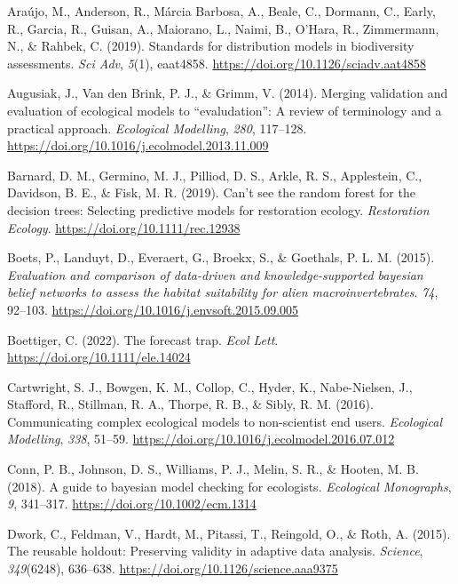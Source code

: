 \documentclass[
]{article}
\newlength{\cslhangindent}
\newenvironment{CSLReferences}[2] %
 {\begin{list}{}{%
  \setlength{\itemindent}{0pt}
  \setlength{\leftmargin}{0pt}
  \setlength{\parsep}{0pt}
  \ifodd #1
   \setlength{\leftmargin}{\cslhangindent}
   \setlength{\itemindent}{-1\cslhangindent}
  \fi
  \setlength{\itemsep}{#2\baselineskip}}}
 {\end{list}}
\begin{document}
\label{refs}
\begin{CSLReferences}{1}{0}
Araújo, M., Anderson, R., Márcia Barbosa, A., Beale, C., Dormann, C.,
Early, R., Garcia, R., Guisan, A., Maiorano, L., Naimi, B., O'Hara, R.,
Zimmermann, N., \& Rahbek, C. (2019). Standards for distribution models
in biodiversity assessments. \emph{Sci Adv}, \emph{5}(1), eaat4858.
\url{https://doi.org/10.1126/sciadv.aat4858}

Augusiak, J., Van den Brink, P. J., \& Grimm, V. (2014). Merging
validation and evaluation of ecological models to {``evaludation''}: A
review of terminology and a practical approach. \emph{Ecological
Modelling}, \emph{280}, 117--128.
\url{https://doi.org/10.1016/j.ecolmodel.2013.11.009}

Barnard, D. M., Germino, M. J., Pilliod, D. S., Arkle, R. S.,
Applestein, C., Davidson, B. E., \& Fisk, M. R. (2019). Can't see the
random forest for the decision trees: Selecting predictive models for
restoration ecology. \emph{Restoration Ecology}.
\url{https://doi.org/10.1111/rec.12938}

Boets, P., Landuyt, D., Everaert, G., Broekx, S., \& Goethals, P. L. M.
(2015). \emph{Evaluation and comparison of data-driven and
knowledge-supported bayesian belief networks to assess the habitat
suitability for alien macroinvertebrates}. \emph{74}, 92--103.
\url{https://doi.org/10.1016/j.envsoft.2015.09.005}

Boettiger, C. (2022). The forecast trap. \emph{Ecol Lett}.
\url{https://doi.org/10.1111/ele.14024}

Cartwright, S. J., Bowgen, K. M., Collop, C., Hyder, K., Nabe-Nielsen,
J., Stafford, R., Stillman, R. A., Thorpe, R. B., \& Sibly, R. M.
(2016). Communicating complex ecological models to non-scientist end
users. \emph{Ecological Modelling}, \emph{338}, 51--59.
\url{https://doi.org/10.1016/j.ecolmodel.2016.07.012}

Conn, P. B., Johnson, D. S., Williams, P. J., Melin, S. R., \& Hooten,
M. B. (2018). A guide to bayesian model checking for ecologists.
\emph{Ecological Monographs}, \emph{9}, 341--317.
\url{https://doi.org/10.1002/ecm.1314}

Dwork, C., Feldman, V., Hardt, M., Pitassi, T., Reingold, O., \& Roth,
A. (2015). The reusable holdout: Preserving validity in adaptive data
analysis. \emph{Science}, \emph{349}(6248), 636--638.
\url{https://doi.org/10.1126/science.aaa9375}


\end{CSLReferences}
\end{document}
